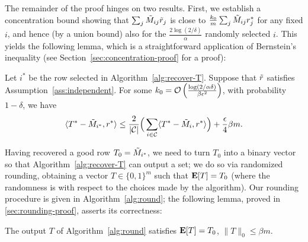The remainder of the proof hinges on two results. First, we establish 
a concentration bound showing that $\sum_j \tilde{M}_{ij}\tilde{r}_j$ is close to 
$\frac{k_0}{m}\sum_j \tilde{M}_{ij}r^*_j$ for any fixed $i$, and hence (by a union bound) 
also for the $\frac{2\log(2/\delta)}{\alpha}$ randomly selected $i$. 
This yields the following lemma, which is a straightforward 
application of Bernstein's inequality (see Section~\ref{sec:concentration-proof} for a proof):
\begin{lemma}
\label{lem:robs-rtrue}
Let $i^*$ be the row selected in Algorithm~\ref{alg:recover-T}. 
Suppose that $\tilde{r}$ satisfies Assumption~\ref{ass:independent}. 
For some 
$k_0 = \mathcal{O}\left( \frac{\log(2/\alpha\delta)}{\beta\epsilon^2} \right)$, 
with probability $1-\delta$, we have
\vskip -0.15in
\begin{equation}
\label{eq:robs-rtrue}
\langle T^*-\tilde{M}_{i^*}, r^* \rangle \leq \frac{2}{|\mathcal{C}|} \Big(\sum_{i \in \mathcal{C}} \langle T^* - \tilde{M}_i, r^* \rangle\Big) + \frac{\epsilon}{4}\beta m.
\end{equation}
\end{lemma}
\vskip -0.1in

Having recovered a good row $T_0 = \tilde{M}_{i^*}$, 
we need to turn $T_0$ into a binary vector so that 
Algorithm~\ref{alg:recover-T} can output a set;
we do so via randomized rounding, obtaining a vector $T \in \{0,1\}^m$ such that 
$\mathbf{E}[T] = T_0$ (where the randomness is with respect to the choices made by the algorithm).
Our rounding procedure is given in Algorithm~\ref{alg:round}; the following 
lemma, proved in \ref{sec:rounding-proof}, asserts its correctness:
\begin{lemma}
\label{lem:rounding}
The output $T$ of Algorithm~\ref{alg:round} satisfies $\mathbf{E}[T] = T_0$, 
$\|T\|_0 \leq \beta m$.
\end{lemma}



